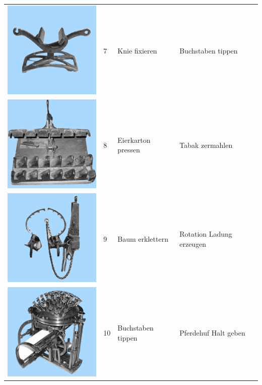 \documentclass[
  english,
  doc,12pt,twoside,floatsintext]{apa7}
\begin{document}
\begin{center}
\begin{ThreePartTable}
\begin{longtable}{llll}
\includegraphics[valign=c, scale=0.19]{../materials/unfamiliar/7.png} & 7 & Knie fixieren & Buchstaben tippen\\
\includegraphics[valign=c, scale=0.19]{../materials/unfamiliar/8.png} & 8 & Eierkarton pressen & Tabak zermahlen\\
\includegraphics[valign=c, scale=0.19]{../materials/unfamiliar/9.png} & 9 & Baum erklettern & Rotation Ladung erzeugen\\
\includegraphics[valign=c, scale=0.19]{../materials/unfamiliar/10.png} & 10 & Buchstaben tippen & Pferdehuf Halt geben\\

\end{longtable}
\end{ThreePartTable}
\end{center}
\end{document}
